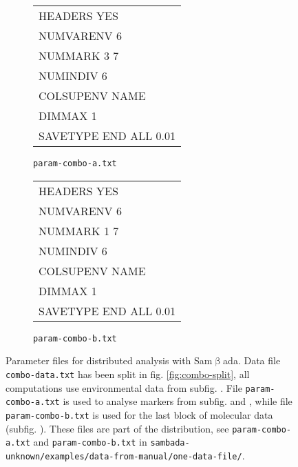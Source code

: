 \documentclass[a4paper,11pt]{article}
\newcommand{\versionnumber}{unknown}
\newcommand{\smb}{\textsf{Sam$\upbeta$ada}}
\newcommand{\pathtodatafrommanual}{\texttt{sambada-\versionnumber/examples/data-from-manual/}}
\newcommand{\pathtoonedatafile}{\pathtodatafrommanual\texttt{one-data-file/}}
\begin{document}
\begin{figure}[htbp]
\centering

\hfill%
\begin{subfigure}{6cm}
\centering
\ttfamily
\begin{tabular}{|l|}
\hline
HEADERS YES\\	
NUMVARENV 6\\	
NUMMARK 3 7	\\
NUMINDIV 6\\
COLSUPENV NAME\\
DIMMAX 1\\
SAVETYPE END ALL 0.01\\
\hline
\end{tabular}%
\caption{\texttt{param-combo-a.txt}}
\label{fig:fichier-param-parallele-combo-a}
\end{subfigure}%
\hfill%
\begin{subfigure}{6cm}
\centering
\ttfamily
\begin{tabular}{|l|}
\hline
HEADERS YES\\	
NUMVARENV 6\\	
NUMMARK 1 7	\\
NUMINDIV 6\\
COLSUPENV NAME\\
DIMMAX 1\\
SAVETYPE END ALL 0.01\\
\hline
\end{tabular}%
\caption{\texttt{param-combo-b.txt}}
\label{fig:fichier-param-parallele-combo-b}
\end{subfigure}%
\hfill

\caption[Exemple de fichier de paramètres pour \smb.]
{
	Parameter files for distributed analysis with \smb.
	Data file \texttt{combo-data.txt} has been split in fig. \ref{fig:combo-split}, all computations use environmental data from subfig. \emph{}.
	File \texttt{param-combo-a.txt} is used to analyse markers from subfig. \emph{} and \emph{}, while file \texttt{param-combo-b.txt} is used for the last block of molecular data (subfig. \emph{}).
	These files are part of the distribution, see \texttt{param-combo-a.txt} and \texttt{param-combo-b.txt} in \pathtoonedatafile.
}
\label{fig:fichier-param-parallele-combo}
\end{figure}
\end{document}
